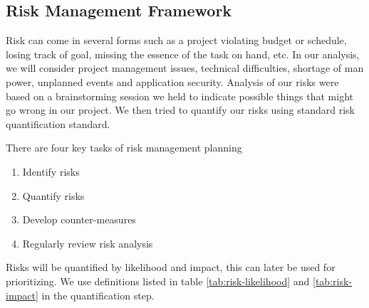 \subsection{Risk Management Framework}

Risk can come in several forms such as a
project violating budget or schedule, losing track of goal, missing the
essence of the task on hand, etc. In our analysis, we will consider project
management issues, technical difficulties, shortage of man power, unplanned events
and application security\cite{risk:rmf1}. Analysis of our risks were based on a brainstorming session we held to indicate possible things that might go wrong in our project. We then tried to quantify our risks using standard risk quantification standard. 

There are four key tasks of risk management planning\cite{risk:rmf2}
\begin{enumerate}
    \item{Identify risks}
	\item{Quantify risks}
	\item{Develop counter-measures}
    \item{Regularly review risk analysis}
\end{enumerate}

Risks will be quantified by likelihood and impact, this can later be used for
prioritizing. We use definitions listed in table \ref{tab:risk-likelihood} and
\ref{tab:risk-impact} in the quantification step.

